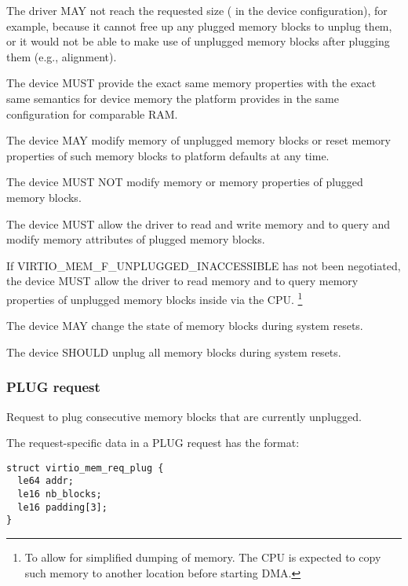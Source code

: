 The driver MAY not reach the requested size ( in the
device configuration), for example, because it cannot free up any plugged
memory blocks to unplug them, or it would not be able to make use of
unplugged memory blocks after plugging them (e.g., alignment).


The device MUST provide the exact same memory properties with the exact same
semantics for device memory the platform provides in the same configuration for
comparable RAM.

The device MAY modify memory of unplugged memory blocks or reset memory
properties of such memory blocks to platform defaults at any time.

The device MUST NOT modify memory or memory properties of plugged memory
blocks.

The device MUST allow the driver to read and write memory and to query
and modify memory attributes of plugged memory blocks.

If VIRTIO_MEM_F_UNPLUGGED_INACCESSIBLE has not been negotiated, the device
MUST allow the driver to read memory and to query memory properties of
unplugged memory blocks inside  via the CPU.
\footnote{To allow for simplified dumping of memory. The CPU is expected to
copy such memory to another location before starting DMA.}

The device MAY change the state of memory blocks during system resets.

The device SHOULD unplug all memory blocks during system resets.

\subsubsection{PLUG request}\label{sec:Device Types / Memory Device / Device Operation / PLUG request}

Request to plug consecutive memory blocks that are currently unplugged.

The request-specific data in a PLUG request has the format:

\begin{lstlisting}
struct virtio_mem_req_plug {
  le64 addr;
  le16 nb_blocks;
  le16 padding[3];
}
\end{lstlisting}

